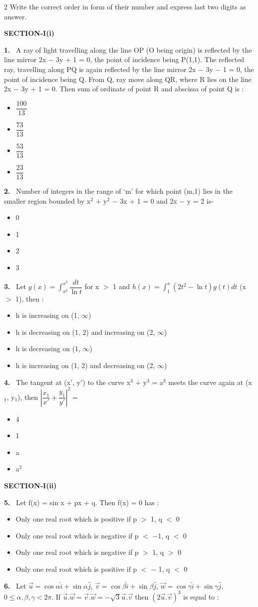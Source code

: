 \documentclass[10pt]{extarticle}
\newcommand{\partsec}[2]{\par\medskip\noindent{\large\bfseries PART-#1: #2}\par\smallskip}
\newcommand{\sect}[1]{\par\smallskip\noindent\textbf{#1}\par}
\newcommand{\qn}[1]{\par\smallskip\noindent\textbf{#1.}~}
\newenvironment{qoptions}{\begin{itemize}[leftmargin=1.8em,itemsep=1pt,topsep=2pt,label={}]}{\end{itemize}}
\newcommand{\opt}[2]{\item[(#1)] #2}
\begin{document}
\begin{multicols}{2}
Write the correct order in form of their number and express last two digits as answer.\par
[ For, e.g. if order is 1357, then your answer will be 57]
\partsec{3}{MATHEMATICS}
\sect{SECTION-I(i)}
\qn{1} A ray of light travelling along the line OP (O being origin) is reflected by the line mirror 2x $-$ 3y + 1 = 0, the point of incidence being P(1,1). The reflected ray, travelling along PQ is again reflected by the line mirror 2x $-$ 3y $-$ 1 = 0, the point of incidence being Q. From Q, ray move along QR, where R lies on the line 2x $-$ 3y + 1 = 0. Then sum of ordinate of point R and abscissa of point Q is :
\begin{qoptions}
\opt{A}{$\dfrac{100}{13}$}
\opt{B}{$\dfrac{73}{13}$}
\opt{C}{$\dfrac{53}{13}$}
\opt{D}{$\dfrac{23}{13}$}
\end{qoptions}
\qn{2} Number of integers in the range of `m' for which point (m,1) lies in the smaller region bounded by x$^2$ + y$^2$ $-$ 3x + 1 = 0 and 2x $-$ y = 2 is-
\begin{qoptions}
\opt{A}{0}
\opt{B}{1}
\opt{C}{2}
\opt{D}{3}
\end{qoptions}
\qn{3} Let $g(x)=\displaystyle\int_{x^2}^{x^3}\dfrac{dt}{\ln t}$ for x $>$ 1 and $h(x)=\displaystyle\int_1^x\left(2t^2-\ln t\right)g(t)dt$ (x $>$ 1), then :
\begin{qoptions}
\opt{A}{h is increasing on (1, $\infty$)}
\opt{B}{h is decreasing on (1, 2) and increasing on (2, $\infty$)}
\opt{C}{h is decreasing on (1, $\infty$)}
\opt{D}{h is increasing on (1, 2) and decreasing on (2, $\infty$)}
\end{qoptions}
\qn{4} The tangent at (x$'$, y$'$) to the curve x$^3$ + y$^3$ = a$^3$ meets the curve again at (x$_1$, y$_1$), then $\left|\dfrac{x_1}{x'}+\dfrac{y_1}{y'}\right|^2=$
\begin{qoptions}
\opt{A}{4}
\opt{B}{1}
\opt{C}{a}
\opt{D}{a$^2$}
\end{qoptions}
\sect{SECTION-I(ii)}
\qn{5} Let f(x) = sin x + px + q. Then f(x) = 0 has :
\begin{qoptions}
\opt{A}{Only one real root which is positive if p $>$ 1, q $<$ 0}
\opt{B}{Only one real root which is negative if p $<$ $-$1, q $<$ 0}
\opt{C}{Only one real root which is negative if p $>$ 1, q $>$ 0}
\opt{D}{Only one real root which is positive if p $<$ $-$ 1, q $<$ 0}
\end{qoptions}
\qn{6} Let $\vec u=\cos\alpha\hat i+\sin\alpha\hat j$, $\vec v=\cos\beta\hat i+\sin\beta\hat j$, $\vec w=\cos\gamma\hat i+\sin\gamma\hat j$, $0\leq\alpha,\beta,\gamma<2\pi$. If $\vec u.\vec w=\vec v.\vec w=-\sqrt3\vec u.\vec v$ then $\left(2\vec u.\vec v\right)^3$ is equal to :

\end{multicols}
\end{document}
